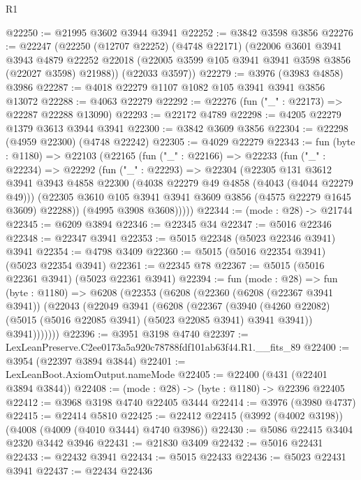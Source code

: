 \begin{lexlean}{R1}
\begin{coremodule}
@22250 := @21995 @3602 @3944 @3941
@22252 := @3842 @3598 @3856
@22276 := @22247
    (@22250
      (@12707 @22252)
      (@4748 @22171)
      (@22006
        @3601
        @3941
        @3943
        @4879
        @22252
        @22018
        (@22005 @3599 @105 @3941 @3941 @3598 @3856 (@22027 @3598) @21988))
      (@22033 @3597))
@22279 := @3976 (@3983 @4858) @3986
@22287 := @4018 @22279 @1107 @1082 @105 @3941 @3941 @3856 @13072
@22288 := @4063 @22279
@22292 := @22276 (fun ("_" : @22173) => @22287 @22288 @13090)
@22293 := @22172 @4789
@22298 := @4205 @22279 @1379 @3613 @3944 @3941
@22300 := @3842 @3609 @3856
@22304 := @22298 (@4959 @22300) (@4748 @22242)
@22305 := @4029 @22279
@22343 := fun (byte : @1180) =>
  @22103
    (@22165
      (fun ("_" : @22166) =>
      @22233
        (fun ("_" : @22234) =>
        @22292
          (fun ("_" : @22293) =>
          @22304
            (@22305
              @131
              @3612
              @3941
              @3943
              @4858
              @22300
              (@4038 @22279 @49 @4858 (@4043 (@4044 @22279 @49)))
              (@22305 @3610 @105 @3941 @3941 @3609 @3856 (@4575 @22279 @1645 @3609) @22288))
            (@4995 @3908 @3608)))))
@22344 := (mode : @28) -> @21744
@22345 := @6209 @3894
@22346 := @22345 @34
@22347 := @5016 @22346
@22348 := @22347 @3941
@22353 := @5015 @22348 (@5023 @22346 @3941) @3941
@22354 := @4798 @3409
@22360 := @5015 (@5016 @22354 @3941) (@5023 @22354 @3941)
@22361 := @22345 @78
@22367 := @5015 (@5016 @22361 @3941) (@5023 @22361 @3941)
@22394 := fun (mode : @28) =>
  fun (byte : @1180) =>
  @6208
    (@22353
      (@6208
        (@22360
          (@6208 (@22367 @3941 @3941))
          (@22043
            (@22049
              @3941
              (@6208
                (@22367
                  (@3940
                    (@4260 @22082)
                    (@5015 (@5016 @22085 @3941) (@5023 @22085 @3941) @3941 @3941))
                  @3941)))))))
@22396 := @3951 @3198 @4740
@22397 := LexLeanPreserve.C2ee0173a5a920c78788fdf101ab63f44.R1.__fits_89
@22400 := @3954 (@22397 @3894 @3844)
@22401 := LexLeanBoot.AxiomOutput.nameMode
@22405 := @22400 (@431 (@22401 @3894 @3844))
@22408 := (mode : @28) -> (byte : @1180) -> @22396 @22405
@22412 := @3968 @3198 @4740 @22405 @3444
@22414 := @3976 (@3980 @4737)
@22415 := @22414 @5810
@22425 := @22412 @22415 (@3992 (@4002 @3198)) (@4008 (@4009 (@4010 @3444) @4740 @3986))
@22430 := @5086 @22415 @3404 @2320 @3442 @3946
@22431 := @21830 @3409
@22432 := @5016 @22431
@22433 := @22432 @3941
@22434 := @5015 @22433
@22436 := @5023 @22431 @3941
@22437 := @22434 @22436

\end{coremodule}
\end{lexlean}
